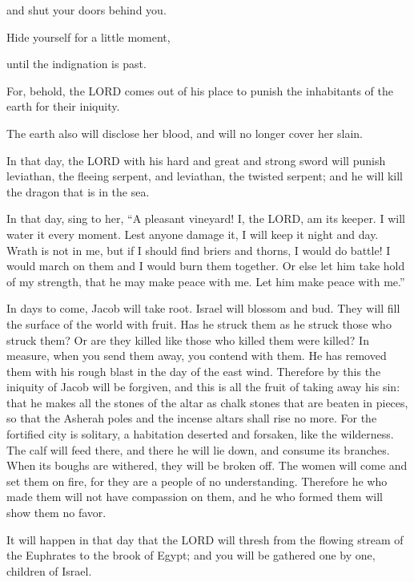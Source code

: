 and shut your doors behind you.

Hide yourself for a little moment,

until the indignation is past.

\myverse{}For, behold, the LORD comes out of his place to punish the
inhabitants of the earth for their iniquity.

The earth also will disclose her blood, and will no longer cover her slain.


\mychapter{} \myverse*{}In that day, the LORD with his hard and great and strong sword
will punish leviathan, the fleeing serpent, and leviathan, the twisted serpent; and he will kill the dragon
that is in the sea.

\myverse{}In that day, sing to her, “A pleasant vineyard!
\myverse{}I, the LORD, am its keeper. I will water it every moment. Lest anyone damage
it, I will keep it night and day.
\myverse{}Wrath is not in me, but if I should find briers and thorns, I would do battle!
I would march on them and I would burn them together.
\myverse{}Or else let him take hold of my strength, that he may make peace with me. Let
him make peace with me.”

\myverse{}In days to come, Jacob will take root. Israel will blossom and
bud. They will fill the surface of the world with fruit.
\myverse{}Has he struck them as he struck those who struck them? Or are they killed like
those who killed them were killed?
\myverse{}In measure, when you send them away, you contend with them. He has removed
them with his rough blast in the day of the east wind.
\myverse{}Therefore by this the iniquity of Jacob will be forgiven, and this is all the
fruit of taking away his sin: that he makes all the stones of the altar as chalk stones that are beaten
in pieces, so that the Asherah poles and the incense altars shall rise no more.
\myverse{}For the fortified city is solitary, a habitation deserted and forsaken, like
the wilderness. The calf will feed there, and there he will lie down, and consume its branches.
\myverse{}When its boughs are withered, they will be broken off. The women will come
and set them on fire, for they are a people of no understanding. Therefore he who made them will not have
compassion on them, and he who formed them will show them no favor.

\myverse{}It will happen in that day that the LORD will thresh from the
flowing stream of the Euphrates to the brook of Egypt; and you will be gathered one by one, children of
Israel.

